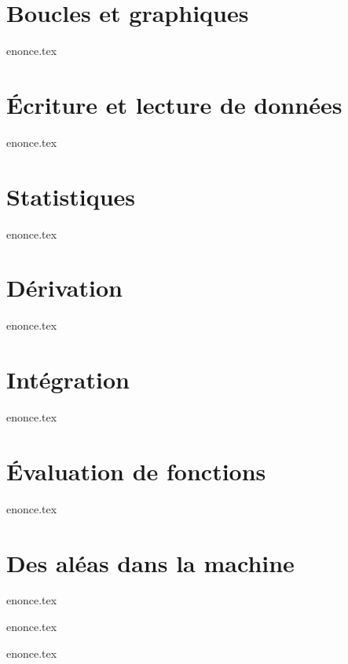 \documentclass[a4paper,11pt,titlepage]{article}
\begin{document}
\section{Boucles et graphiques}
{enonce.tex}
\pagebreak


\section{Écriture et lecture de données}
{enonce.tex}
\pagebreak

\section{Statistiques}
{enonce.tex}
\pagebreak

\section{Dérivation}
{enonce.tex}
\FloatBarrier
\pagebreak

\section{Intégration}
{enonce.tex}
\pagebreak

\section{Évaluation de fonctions}
{enonce.tex}
\pagebreak

\section{Des aléas dans la machine}
{enonce.tex}
\pagebreak

{enonce.tex}
\pagebreak

{enonce.tex}
\end{document}
